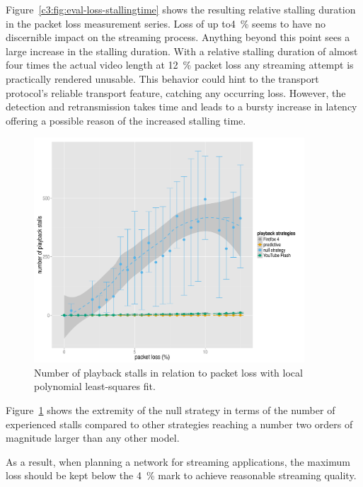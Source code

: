 Figure~\ref{c3:fig:eval-loss-stallingtime} shows the resulting relative stalling duration in the packet loss measurement series. Loss of up to\SI{4}{\percent} seems to have no discernible impact on the streaming process. Anything beyond this point sees a large increase in the stalling duration. With a relative stalling duration of almost four times the actual video length at \SI{12}{\percent} packet loss any streaming attempt is practically rendered unusable. This behavior could hint to the transport protocol's reliable transport feature, catching any occurring loss. However, the detection and retransmission takes time and leads to a bursty increase in latency offering a possible reason of the increased stalling time.


\begin{figure}[htb]
    \centering
    \includegraphics[width=0.9\textwidth]{images/R-playbackemulation-stallnumber-loss.pdf}
    \caption{Number of playback stalls in relation to packet loss with local polynomial least-squares fit.}
    \label{c3:fig:eval-loss-numstalls}
\end{figure}


Figure~\ref{c3:fig:eval-loss-numstalls} shows the extremity of the null strategy in terms of the number of experienced stalls compared to other strategies reaching a number two orders of magnitude larger than any other model. 


As a result, when planning a network for streaming applications, the maximum loss should be kept below the \SI{4}{\percent} mark to achieve reasonable streaming quality. 



